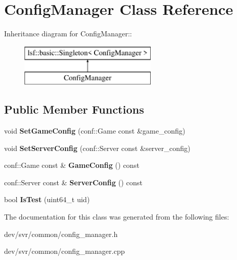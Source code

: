 \hypertarget{classConfigManager}{
\section{ConfigManager Class Reference}
\label{classConfigManager}
}
Inheritance diagram for ConfigManager::\begin{figure}[H]
\begin{center}
\leavevmode
\includegraphics[height=2cm]{classConfigManager}
\end{center}
\end{figure}
\subsection*{Public Member Functions}
\begin{DoxyCompactItemize}
\item 
\hypertarget{classConfigManager_a0dd538d9cad652149ef534cbf6a8165c}{
void {\bfseries SetGameConfig} (conf::Game const \&game\_\-config)}
\label{classConfigManager_a0dd538d9cad652149ef534cbf6a8165c}

\item 
\hypertarget{classConfigManager_afccef86df39ce7bf18472a5b4d5ad99b}{
void {\bfseries SetServerConfig} (conf::Server const \&server\_\-config)}
\label{classConfigManager_afccef86df39ce7bf18472a5b4d5ad99b}

\item 
\hypertarget{classConfigManager_a8e6e9c47186a3681b01e8d5678cbd93d}{
conf::Game const \& {\bfseries GameConfig} () const }
\label{classConfigManager_a8e6e9c47186a3681b01e8d5678cbd93d}

\item 
\hypertarget{classConfigManager_a44ddf341b3d02ce64524482e060553d8}{
conf::Server const \& {\bfseries ServerConfig} () const }
\label{classConfigManager_a44ddf341b3d02ce64524482e060553d8}

\item 
\hypertarget{classConfigManager_af7197f348fbe58ec708d5e67b9f94676}{
bool {\bfseries IsTest} (uint64\_\-t uid)}
\label{classConfigManager_af7197f348fbe58ec708d5e67b9f94676}

\end{DoxyCompactItemize}


The documentation for this class was generated from the following files:\begin{DoxyCompactItemize}
\item 
dev/svr/common/config\_\-manager.h\item 
dev/svr/common/config\_\-manager.cpp\end{DoxyCompactItemize}
